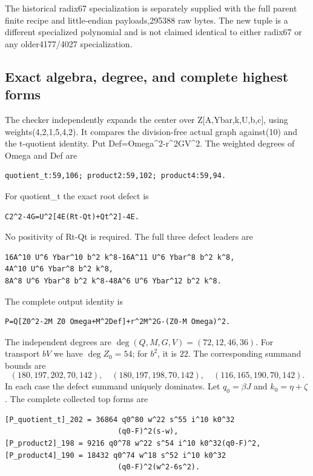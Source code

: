 The historical radix67 specialization is separately supplied with the
full parent finite recipe and little-endian payloads,295388 raw bytes.
The new tuple is a different specialized polynomial and is not claimed
identical to either radix67 or any older4177/4027 specialization.

\subsection{Exact algebra, degree, and complete highest
forms}\label{exact-algebra-degree-and-complete-highest-forms}

The checker independently expands the center over Z{[}A,Ybar,k,U,b,c{]},
using weights(4,2,1,5,4,2). It compares the division-free actual graph
against(10) and the t-quotient identity. Put
Def=Omega\^{}2-r\^{}2GV\^{}2. The weighted degrees of Omega and Def are

\begin{verbatim}
quotient_t:59,106; product2:59,102; product4:59,94.
\end{verbatim}

For quotient\_t the exact root defect is

\begin{verbatim}
C2^2-4G=U^2[4E(Rt-Qt)+Qt^2]-4E.
\end{verbatim}

No positivity of Rt-Qt is required. The full three defect leaders are

\begin{verbatim}
16A^10 U^6 Ybar^10 b^2 k^8-16A^11 U^6 Ybar^8 b^2 k^8,
4A^10 U^6 Ybar^8 b^2 k^8,
8A^8 U^6 Ybar^8 b^2 k^8-48A^6 U^6 Ybar^12 b^2 k^8.
\end{verbatim}

The complete output identity is

\begin{verbatim}
P=Q[Z0^2-2M Z0 Omega+M^2Def]+r^2M^2G-(Z0-M Omega)^2.
\end{verbatim}

The independent degrees are
$\deg(Q,M,G,V)=(72,12,46,36)$.
For transport $bV$ we have $\deg Z_0=54$; for $b^2$, it is $22$.
The corresponding summand bounds are
\[
(180,197,202,70,142),\quad (180,197,198,70,142),\quad
(116,165,190,70,142).
\]
In each case the defect summand uniquely dominates.
Let $q_0=\beta J$ and $k_0=\eta+\zeta$.
The complete collected top forms are

\begin{verbatim}
[P_quotient_t]_202 = 36864 q0^80 w^22 s^55 i^10 k0^32
                          (q0-F)^2(s-w),
[P_product2]_198 = 9216 q0^78 w^22 s^54 i^10 k0^32(q0-F)^2,
[P_product4]_190 = 18432 q0^74 w^18 s^52 i^10 k0^32
                          (q0-F)^2(w^2-6s^2).
\end{verbatim}

